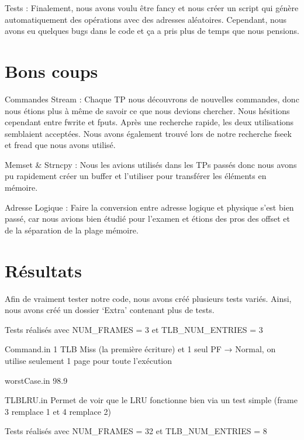 \documentclass{article}
\begin{document}
\par
Tests : Finalement, nous avons voulu être fancy et nous créer un script qui génère automatiquement des opérations avec des adresses aléatoires. Cependant, nous avons eu quelques bugs dans le code et ça a pris plus de temps que nous pensions. 

\section {Bons coups}
\par
Commandes Stream : Chaque TP nous découvrons de nouvelles commandes, donc nous étions plus à même de savoir ce que nous devions chercher. Nous hésitions cependant entre fwrite et fputs. Après une recherche rapide, les deux utilisations semblaient acceptées. Nous avons également trouvé lors de notre recherche fseek et fread que nous avons utilisé.


\par
Memset & Strncpy : Nous les avions utilisés dans les TPs passés donc nous avons pu rapidement créer un buffer et l’utiliser pour transférer les éléments en mémoire.


\par
Adresse Logique : Faire la conversion entre adresse logique et physique s’est bien passé, car nous avions bien étudié pour l’examen et étions des pros des offset et de la séparation de la plage mémoire.


\par
\section{Résultats}
Afin de vraiment tester notre code, nous avons créé plusieurs tests variés. Ainsi, nous avons créé un dossier ‘Extra’ contenant plus de tests.


Tests réalisés avec  NUM_FRAMES = 3 et  TLB_NUM_ENTRIES = 3

Command.in
1 TLB Miss (la première écriture) et 1 seul PF → Normal, on utilise seulement 1 page pour toute l’exécution

worstCase.in
98.9%

TLBLRU.in
Permet de voir que le LRU fonctionne bien via un test simple (frame 3 remplace 1 et 4 remplace 2)


Tests réalisés avec NUM_FRAMES = 32 et   TLB_NUM_ENTRIES = 8
\end{document}

